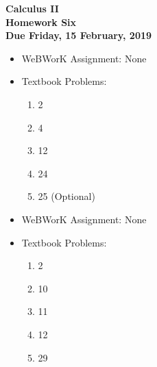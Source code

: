 \documentclass[12pt]{article}
\begin{document}
\pagestyle{empty}
 
\begin{center}
{\large {\bf Calculus II}}\\
\medskip
{\large {\bf Homework Six}}\\
\medskip
{ {\bf Due Friday, 15 February, 2019}}\\
\end{center}



\begin{itemize}
\setlength{\itemsep}{0mm}
\item WeBWorK Assignment: None
\item Textbook Problems:
  \begin{enumerate}
  \setlength{\itemsep}{-1mm}
    \item 2
    \item 4
    \item 12
    \item 24
    \item 25 (Optional)
  \end{enumerate}
\end{itemize}

\begin{itemize}
\setlength{\itemsep}{0mm}
\item WeBWorK Assignment: None
\item Textbook Problems:
  \begin{enumerate}
  \setlength{\itemsep}{-1mm}
    \item 2
    \item 10
    \item 11
    \item 12
    \item 29
  \end{enumerate}
\end{itemize}
\end{document}
